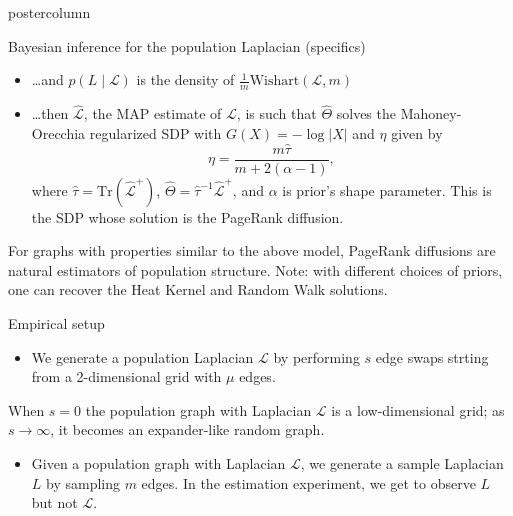 \documentclass[final,hyperref={pdfpagelabels=false}]{beamer}
\begin{document}
\begin{frame}
\begin{columns}
\begin{column}{.49\textwidth}
\begin{beamercolorbox}[center,wd=\textwidth]{postercolumn}
\begin{minipage}[T]{.95\textwidth}
{\begin{block}{Bayesian inference for the population Laplacian (specifics)}
\begin{itemize}
	      \item \ldots and $p(L\mid \mathcal{L})$ is the density of
	      $\frac{1}{m} \mathrm{Wishart}(\mathcal{L}, m)$

	      \item \ldots then $\mathcal{\hat L}$, the MAP estimate of
	      $\mathcal{L}$, is such that $\hat \Theta$ solves the
	      Mahoney-Orecchia regularized SDP with $G(X) = -\log |X|$ and
	      $\eta$ given by
	      \[
		\eta = \frac{m \hat \tau}{m + 2 (\alpha - 1)},
	      \]
	      where $\hat \tau = \mathrm{Tr}(\mathcal{\hat L}^+)$,
	      $\hat \Theta = \hat \tau^{-1} \mathcal{\hat L}^+$,
	      and $\alpha$ is prior's shape parameter.  This is the SDP
	      whose solution is the PageRank diffusion.
	    \end{itemize}
	    \vspace{1em}
	    For graphs with properties similar to the above model, PageRank
	    diffusions are natural estimators of population structure.
	    Note: with different choices of priors, one can recover the Heat
	    Kernel and Random Walk solutions.
            \end{block}

            \vfill

            \begin{block}{Empirical setup}
	    \begin{itemize}
	    \item We generate a population Laplacian $\mathcal{L}$ by
	    performing $s$ edge swaps strting from a 2-dimensional grid with
	    $\mu$ edges.
	    \end{itemize}

  \begin{center}
  \end{center}
  \vspace{-1em}
  When $s = 0$ the population graph with Laplacian $\mathcal{L}$ is a
  low-dimensional grid; as $s \to \infty$, it becomes an expander-like 
  random graph.
  \vspace{1em}

	    \begin{itemize}
  \item Given a population graph with Laplacian $\mathcal{L}$,
  we generate a sample Laplacian $L$ by sampling $m$ edges.
  In the estimation experiment, we get to observe $L$ but not $\mathcal{L}$.
	    \end{itemize}


\end{block}}
\end{minipage}
\end{beamercolorbox}
\end{column}
\end{columns}
\end{frame}
\end{document}
